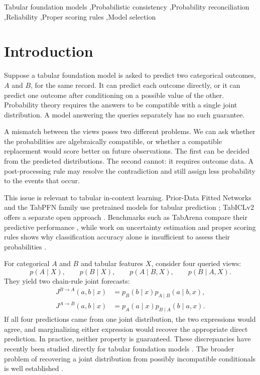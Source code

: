\documentclass[a4paper,fleqn]{cas-sc}
\newcommand{\Jone}{J^{B\rightarrow A}}
\newcommand{\Jtwo}{J^{A\rightarrow B}}
\begin{document}
\begin{keywords}
Tabular foundation models \sep Probabilistic consistency \sep Probability reconciliation \sep Reliability \sep Proper scoring rules \sep Model selection
\end{keywords}

\maketitle

\section{Introduction}
Suppose a tabular foundation model is asked to predict two categorical outcomes, $A$ and $B$, for the same record. It can predict each outcome directly, or it can predict one outcome after conditioning on a possible value of the other. Probability theory requires the answers to be compatible with a single joint distribution. A model answering the queries separately has no such guarantee.

A mismatch between the views poses two different problems. We can ask whether the probabilities are algebraically compatible, or whether a compatible replacement would score better on future observations. The first can be decided from the predicted distributions. The second cannot: it requires outcome data. A post-processing rule may resolve the contradiction and still assign less probability to the events that occur.

This issue is relevant to tabular in-context learning. Prior-Data Fitted Networks and the TabPFN family use pretrained models for tabular prediction \citep{muller2022pfns,hollmann2023tabpfn,hollmann2025tabpfn,grinsztajn2025tabpfn25,grinsztajn2026tabpfn3}; TabICLv2 offers a separate open approach \citep{qu2026tabiclv2}. Benchmarks such as TabArena compare their predictive performance \citep{erickson2025tabarena}, while work on uncertainty estimation and proper scoring rules shows why classification accuracy alone is insufficient to assess their probabilities \citep{landsgesell2026scoringbench,johnson2026uq,costa2026lowreliability,tanna2026ensembling}.

For categorical $A$ and $B$ and tabular features $X$, consider four queried views:
\begin{equation}
p(A\mid X),\qquad p(B\mid X),\qquad p(A\mid B,X),\qquad p(B\mid A,X).
\end{equation}
They yield two chain-rule joint forecasts:
\begin{align}
\Jone(a,b\mid x)&=p_B(b\mid x)p_{A\mid B}(a\mid b,x),\\
\Jtwo(a,b\mid x)&=p_A(a\mid x)p_{B\mid A}(b\mid a,x).
\end{align}
If all four predictions came from one joint distribution, the two expressions would agree, and marginalizing either expression would recover the appropriate direct prediction. In practice, neither property is guaranteed. These discrepancies have recently been studied directly for tabular foundation models \citep{klotergens2026agree}. The broader problem of recovering a joint distribution from possibly incompatible conditionals is well established \citep{majid2025consistent,mure2019compromise}.
\end{document}
